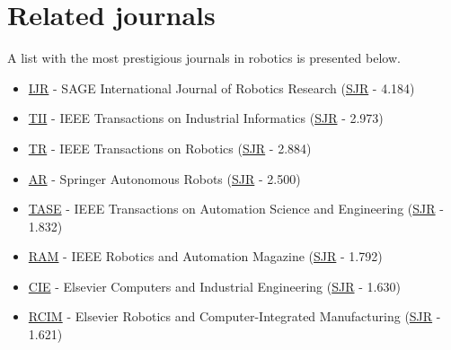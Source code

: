 \section{Related journals}

A list with the most prestigious journals in robotics is presented below.

\begin{itemize}[leftmargin=2em]
	\item \href{http://ijr.sagepub.com/}{IJR} - SAGE International Journal of Robotics Research (\href{http://www.scimagojr.com/journalsearch.php?q=18050\&tip=sid\&clean=0}{SJR} - 4.184)
	\item \href{http://ieeexplore.ieee.org/xpl/RecentIssue.jsp?punumber=9424}{TII} - IEEE Transactions on Industrial Informatics (\href{http://www.scimagojr.com/journalsearch.php?q=144912\&tip=sid\&clean=0}{SJR} - 2.973)
	\item \href{http://ieeexplore.ieee.org/xpl/RecentIssue.jsp?punumber=8860}{TR} - IEEE Transactions on Robotics (\href{http://www.scimagojr.com/journalsearch.php?q=95101\&tip=sid\&clean=0}{SJR} - 2.884)
	\item \href{http://www.springer.com/engineering/robotics/journal/10514}{AR} - Springer Autonomous Robots (\href{http://www.scimagojr.com/journalsearch.php?q=18016\&tip=sid\&clean=0}{SJR} - 2.500)
	\item \href{http://ieeexplore.ieee.org/xpl/RecentIssue.jsp?punumber=8856}{TASE} - IEEE Transactions on Automation Science and Engineering (\href{http://www.scimagojr.com/journalsearch.php?q=17340\&tip=sid\&clean=0}{SJR} - 1.832)
	\item \href{http://ieeexplore.ieee.org/xpl/RecentIssue.jsp?punumber=100}{RAM} - IEEE Robotics and Automation Magazine (\href{http://www.scimagojr.com/journalsearch.php?q=18027\&tip=sid\&clean=0}{SJR} - 1.792)
	\item \href{http://www.journals.elsevier.com/computers-and-industrial-engineering/}{CIE} - Elsevier Computers and Industrial Engineering (\href{http://www.scimagojr.com/journalsearch.php?q=18164\&tip=sid\&clean=0}{SJR} - 1.630)
	\item \href{http://www.journals.elsevier.com/robotics-and-computer-integrated-manufacturing/}{RCIM} - Elsevier Robotics and Computer-Integrated Manufacturing (\href{http://www.scimagojr.com/journalsearch.php?q=18080\&tip=sid\&clean=0}{SJR} - 1.621)

\end{itemize}
